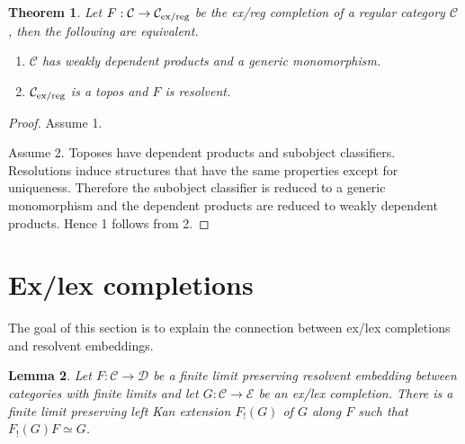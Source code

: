 \documentclass[sort&compress,draft]{elsarticle}
\theoremstyle{plain}
\newtheorem{theorem}{Theorem}
\newtheorem{lemma}[theorem]{Lemma}
\theoremstyle{definition}
\theoremstyle{remark}
\newcommand\hide[1]{}
\newcommand\cat\mathcal
\newcommand\of:
\newcommand\di{_!}
\begin{document}
\begin{theorem} Let $F:\cat C\to\cat C\exreg$ be the ex/reg completion of a regular category $\cat C$, then the following are equivalent.
\begin{enumerate}
\item $\cat C$ has \emph{weakly dependent products} and a \emph{generic monomorphism}. \hide{these need to be defined somewhere}
\item $\cat C\exreg$ is a topos and $F$ is resolvent. 
\end{enumerate}
\end{theorem}

\begin{proof}
Assume 1.

\hide{
The 'more direct proof' from the referee ignores resolvency of the regular completion, which is one of the two most important theorems of this paper. No wonder it can afford to be so simple. It must be an evil plot to bury this most remarkable result, possibly to claim it as his/her own at a later date.
}

Assume 2. Toposes have dependent products and subobject classifiers. Resolutions induce structures that have the same properties except for uniqueness. Therefore the subobject classifier is reduced to a generic monomorphism and the dependent products are reduced to weakly dependent products. Hence 1 follows from 2. %
\end{proof}

\hide{conclusion... }

\section{Ex/lex completions}
The goal of this section is to explain the connection between ex/lex completions and resolvent embeddings.

\begin{lemma} Let $F\of\cat C\to\cat D$ be a finite limit preserving resolvent embedding between categories with finite limits and let $G\of\cat C\to\cat E$ be an ex/lex completion. There is a finite limit preserving left Kan extension $F\di(G)$ of $G$ along $F$ such that $F\di(G)F\simeq G$.\label{lex ex}\end{lemma}
\end{document}
